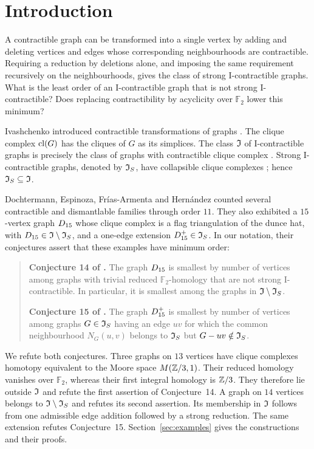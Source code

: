 \section{Introduction}\label{sec:intro}

A contractible graph can be transformed into a single vertex by adding
and deleting vertices and edges whose corresponding neighbourhoods are
contractible. Requiring a reduction by deletions alone, and imposing the
same requirement recursively on the neighbourhoods, gives the class of
strong I-contractible graphs. What is the least order of an I-contractible graph that is not strong
I-contractible? Does replacing contractibility by acyclicity over
$\mathbb F_2$ lower this minimum?

Ivashchenko introduced contractible transformations of graphs
\cite{Ivashchenko1993,Ivashchenko1994a}. The clique complex $\operatorname{cl}(G)$ has
the cliques of $G$ as its simplices. The class $\mathfrak I$ of I-contractible
graphs is precisely the class of graphs with contractible clique complex
\cite[Corollary~1.5]{DochtermannMatsushita2025}.
Strong I-contractible graphs, denoted by $\mathfrak I_S$, have collapsible clique
complexes \cite[Theorem~1]{EFH2022}; hence $\mathfrak I_S\subseteq\mathfrak I$.

Dochtermann, Espinoza, Fr\'ias-Armenta and Hern\'andez
\cite{DEFH2023} counted several contractible and dismantlable families
through order $11$. They also exhibited a $15$-vertex graph $D_{15}$ whose
clique complex is a flag triangulation of the dunce hat, with
$D_{15}\in\mathfrak I\setminus\mathfrak I_S$, and a one-edge extension $D_{15}^+\in\mathfrak I_S$.
In our notation, their conjectures assert that these examples have
minimum order:

\begin{quote}
\textbf{Conjecture 14 of \cite[p.~8]{DEFH2023}.}
The graph $D_{15}$ is smallest by number of vertices among graphs with
trivial reduced $\mathbb F_2$-homology that are not strong
I-contractible. In particular, it is smallest among the graphs in
$\mathfrak I\setminus\mathfrak I_S$.

\smallskip
\textbf{Conjecture 15 of \cite[p.~9]{DEFH2023}.}
The graph $D_{15}^+$ is smallest by number of vertices among graphs
$G\in\mathfrak I_S$ having an edge $uv$ for which the common neighbourhood
$N_G(u,v)$ belongs to $\mathfrak I_S$ but $G-uv\notin\mathfrak I_S$.
\end{quote}

We refute both conjectures. Three graphs on $13$ vertices have clique
complexes homotopy equivalent to the Moore space $M(\mathbb Z/3,1)$.
Their reduced homology vanishes over $\mathbb F_2$, whereas their first
integral homology is $\mathbb Z/3$. They therefore lie outside $\mathfrak I$ and
refute the first assertion of Conjecture~14. A graph on $14$ vertices
belongs to $\mathfrak I\setminus\mathfrak I_S$ and refutes its second assertion. Its
membership in $\mathfrak I$ follows from one admissible edge addition followed
by a strong reduction. The same extension refutes Conjecture~15.
Section~\ref{sec:examples} gives the constructions and their proofs.


